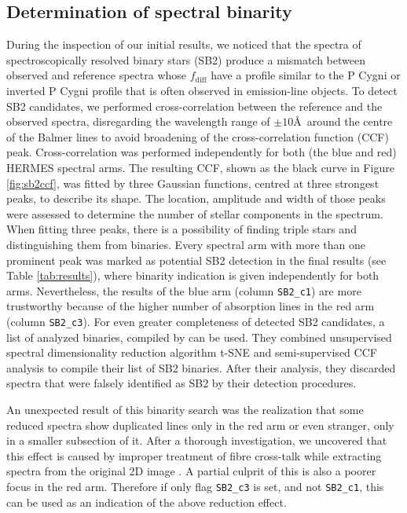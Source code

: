 \subsection{Determination of spectral binarity}
During the inspection of our initial results, we noticed that the spectra of spectroscopically resolved binary stars (SB2) produce a mismatch between observed and reference spectra whose $f_\mathrm{diff}$ have a profile similar to the P Cygni or inverted P Cygni profile \cite{1979ApJS...39..481C} that is often observed in emission-line objects. To detect SB2 candidates, we performed cross-correlation between the reference and the observed spectra, disregarding the wavelength range of $\pm10$\AA\ around the centre of the Balmer lines to avoid broadening of the cross-correlation function (CCF) peak. Cross-correlation was performed independently for both (the blue and red) HERMES spectral arms. The resulting CCF, shown as the black curve in Figure \ref{fig:sb2ccf}, was fitted by three Gaussian functions, centred at three strongest peaks, to describe its shape. The location, amplitude and width of those peaks were assessed to determine the number of stellar components in the spectrum. When fitting three peaks, there is a possibility of finding triple stars and distinguishing them from binaries. Every spectral arm with more than one prominent peak was marked as potential SB2 detection in the final results (see Table \ref{tab:results}), where binarity indication is given independently for both arms. Nevertheless, the results of the blue arm (column \texttt{SB2\_c1}) are more trustworthy because of the higher number of absorption lines in the red arm (column \texttt{SB2\_c3}). For even greater completeness of detected SB2 candidates, a list of analyzed binaries, compiled by \citet{2020arXiv200500014T} can be used. They combined unsupervised spectral dimensionality reduction algorithm t-SNE and semi-supervised CCF analysis \cite{2017A&A...608A..95M} to compile their list of SB2 binaries. After their analysis, they discarded spectra that were falsely identified as SB2 by their detection procedures.

An unexpected result of this binarity search was the realization that some reduced spectra show duplicated lines only in the red arm or even stranger, only in a smaller subsection of it. After a thorough investigation, we uncovered that this effect is caused by improper treatment of fibre cross-talk while extracting spectra from the original 2D image \cite{2017MNRAS.464.1259K}. A partial culprit of this is also a poorer focus in the red arm. Therefore if only flag \texttt{SB2\_c3} is set, and not \texttt{SB2\_c1}, this can be used as an indication of the above reduction effect.


